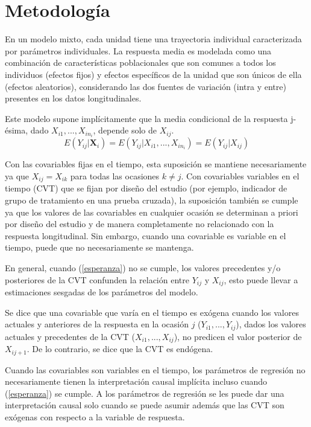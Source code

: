 \documentclass[12pt]{article}
\def\cvt{covariable que varía en el tiempo}
\def\xseqj{$X_{i1}, ..., X_{ij}$}
\def\xseqn{$X_{i1}, ..., X_{in_i}$}
\def\yseqj{$Y_{i1}, ..., Y_{ij}$}
\begin{document}
\newpage
\section{Metodología}

En un modelo mixto, cada unidad tiene una trayectoria individual caracterizada por parámetros individuales.
La respuesta media es modelada como una combinación de características poblacionales que son comunes a todos los
individuos (efectos fijos) y efectos específicos de la unidad que son únicos de ella (efectos aleatorios),
considerando las dos fuentes de variación (intra y entre) presentes en los datos longitudinales.

Este modelo supone implícitamente que la media condicional de la respuesta j-ésima, dado \xseqn{}, depende solo de $X_{ij}$.
\begin{equation}
\label{esperanza}
	E(Y_{ij}|\bm{X}_i) = E(Y_{ij}|X_{i1}, ..., X_{in_i}) = E(Y_{ij}|X_{ij})
\end{equation}

Con las covariables fijas en el tiempo, esta suposición se mantiene necesariamente ya que $X_{ij} = X_{ik}$ para todas las ocasiones
$k \neq j$. Con covariables variables en el tiempo (CVT) que se fijan por diseño del estudio (por ejemplo, indicador
de grupo de tratamiento en una prueba cruzada), la suposición también se cumple ya que los valores de las covariables
en cualquier ocasión se determinan a priori por diseño del estudio y de manera completamente no relacionado con la
respuesta longitudinal. Sin embargo, cuando una covariable es variable en el tiempo, puede que no necesariamente se mantenga.

En general, cuando (\ref{esperanza}) no se cumple, los valores precedentes y/o posteriores de la CVT confunden la
relación entre $Y_{ij}$ y $X_{ij}$, esto puede llevar a estimaciones sesgadas de los parámetros del modelo.

Se dice que una \cvt{} es exógena cuando los valores actuales y anteriores de la respuesta en la ocasión
$j$ (\yseqj{}), dados los valores actuales y precedentes de la CVT (\xseqj{}), no predicen el valor
posterior de $X_{ij+1}$. De lo contrario, se dice que la CVT es endógena.

Cuando las covariables son variables en el tiempo, los parámetros de regresión no
necesariamente tienen la interpretación causal implícita incluso cuando (\ref{esperanza}) se cumple. A los parámetros de
regresión se les puede dar una interpretación causal solo cuando se puede asumir además que las CVT son exógenas con
respecto a la variable de respuesta.
\end{document}
